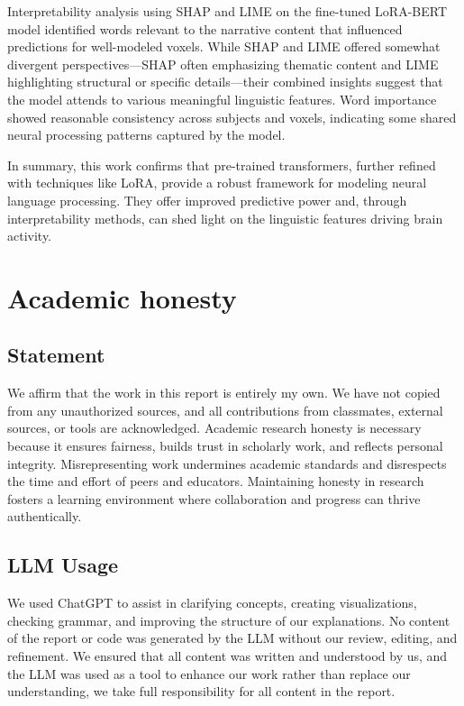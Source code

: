 \documentclass[10pt,letterpaper]{article}
\begin{document}
Interpretability analysis using SHAP and LIME on the fine-tuned LoRA-BERT model identified words relevant to the narrative content that influenced predictions for well-modeled voxels. While SHAP and LIME offered somewhat divergent perspectives—SHAP often emphasizing thematic content and LIME highlighting structural or specific details—their combined insights suggest that the model attends to various meaningful linguistic features. Word importance showed reasonable consistency across subjects and voxels, indicating some shared neural processing patterns captured by the model.

In summary, this work confirms that pre-trained transformers, further refined with techniques like LoRA, provide a robust framework for modeling neural language processing. They offer improved predictive power and, through interpretability methods, can shed light on the linguistic features driving brain activity.

\newpage


\printbibliography

\appendix
\section{Academic honesty}
\subsection{Statement}
We affirm that the work in this report is entirely my own. We have not copied from any unauthorized sources, and all contributions from classmates, external sources, or tools are acknowledged. Academic research honesty is necessary because it ensures fairness, builds trust in scholarly work, and reflects personal integrity. Misrepresenting work undermines academic standards and disrespects the time and effort of peers and educators. Maintaining honesty in research fosters a learning environment where collaboration and progress can thrive authentically.

\subsection{LLM Usage}

We used ChatGPT to assist in clarifying concepts, creating visualizations, checking grammar, and improving the structure of our explanations. No content of the report or code was generated by the LLM without our review, editing, and refinement. We ensured that all content was written and understood by us, and the LLM was used as a tool to enhance our work rather than replace our understanding, we take full responsibility for all content in the report.
\end{document}

